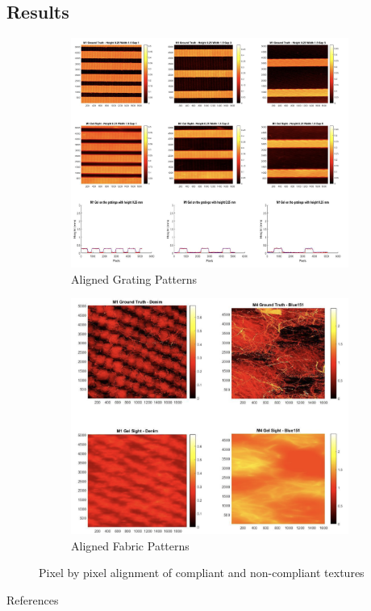 \documentclass[
11pt,notheorems,hyperref={pdfauthor=whatever}
]{beamer}
\begin{document}
\subsection{Results}
\begin{frame}
    \begin{figure}
        \centering
        \begin{subfigure}[b]{0.5\textwidth}
            \centering
            \includegraphics[scale=0.22]{Neuro_ResultGrating.jpg}
            \caption{Aligned Grating Patterns}
        \end{subfigure}
        \begin{subfigure}[b]{0.48\textwidth}
            \centering
            \includegraphics[scale=0.21]{Neuro_ResultFabric.jpg}
            \caption{Aligned Fabric Patterns}
        \end{subfigure}
        \renewcommand{\figurename}{Figure 14}
        \caption{Pixel by pixel alignment of compliant and non-compliant textures}
    \end{figure}
\end{frame}

\begin{frame}[allowframebreaks]{References}
    \printbibliography
\end{frame}
\end{document}
